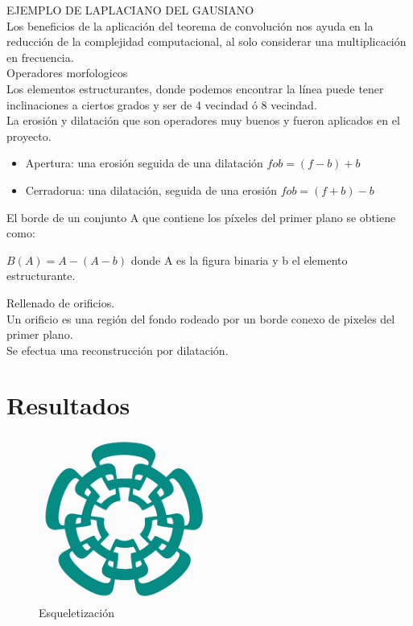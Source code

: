 \documentclass[a4paper, 11pt]{article}
\begin{document}
EJEMPLO DE LAPLACIANO DEL GAUSIANO\\

Los beneficios de la aplicación del teorema de convolución nos ayuda en la reducción de la complejidad computacional, al solo considerar una multiplicación en  frecuencia.\\

Operadores morfologicos\\

Los elementos estructurantes, donde podemos encontrar la línea puede tener inclinaciones a ciertos grados y ser de 4 vecindad ó 8 vecindad.\\

La erosión y dilatación que son operadores muy buenos y fueron aplicados en el proyecto.

\begin{itemize}
\item Apertura: una erosión seguida de una dilatación $f o b = (f-b)+b$
\item Cerradorua: una dilatación, seguida de una erosión $f o b = (f+b)-b$
\end{itemize}

El borde de un conjunto A que contiene los píxeles del primer plano se obtiene como:

$B(A)=A-(A-b)$ donde A es la figura binaria y b el elemento estructurante.

Rellenado de orificios.\\

Un orificio es una región del fondo rodeado por un borde conexo de pixeles del primer plano.\\

Se efectua una reconstrucción por dilatación.\\



\pagebreak

\section{Resultados}

\begin{figure}[h]
\centering
\includegraphics[width=0.5\textwidth]{cinves}
\caption{Esqueletización}
\end{figure}
\end{document}
